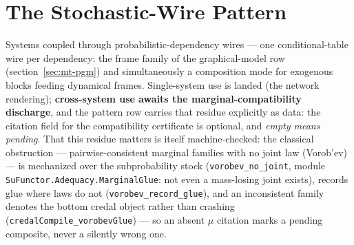

\section{The Stochastic-Wire Pattern}
\label{sec:cp-stochwire}

Systems coupled through probabilistic-dependency wires --- one
conditional-table wire per dependency: the frame family of the
graphical-model row (section~\ref{sec:mt-pgm}) and simultaneously a
composition mode for exogenous blocks feeding dynamical frames.
Single-system use is landed (the network rendering);
\textbf{cross-system use awaits the marginal-compatibility
discharge}, and the pattern row carries that residue explicitly as
data: the citation field for the compatibility certificate is
optional, and \emph{empty means pending}. That this residue matters
is itself machine-checked:
the classical obstruction --- pairwise-consistent marginal families
with no joint law (Vorob'ev) --- is mechanized over the
subprobability stock (\texttt{vorobev\_no\_joint}, module
\texttt{SuFunctor.Adequacy.MarginalGlue}: not even a mass-losing
joint exists), records glue where laws do not
(\texttt{vorobev\_record\_glue}), and an inconsistent family denotes
the bottom credal object rather than crashing
(\texttt{credalCompile\_vorobevGlue}) --- so an absent $\mu$ citation
marks a pending composite, never a silently wrong one.

